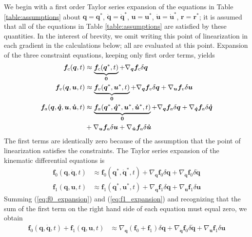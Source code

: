 \documentclass[smallcondensed]{svjour3}                     %
\begin{document}
We begin with a first order Taylor series expansion of the equations in Table
\ref{table:assumptions} about $\bm{q}=\bm{q}^*$, $\bm{\dot{q}}=\bm{\dot{q}}^*$,
$\bm{u}=\bm{u}^*$, $\bm{\dot{u}}=\bm{\dot{u}}^*$, $\bm{r}=\bm{r}^*$; it is
assumed that all of the equations in Table \ref{table:assumptions} are
satisfied by these quantities.  In the interest of brevity, we omit writing
this point of linearization in each gradient in the calculations below; all are
evaluated at this point.  Expansion of the three constraint
equations, keeping only first order terms, yields
\begin{align}
  \label{eq:configuration_expansion}
  \bm{f}_{c}(\bm{q}, t) &\approx \underbrace{\bm{f}_{c}(\bm{q}^*, t)}_{\bm{0}} +
  \nabla_{\bm{q}}\bm{f}_{c} \delta \bm{q}\\
  \label{eq:velocity_expansion}
  \bm{f}_{v}(\bm{q}, \bm{u}, t) &\approx \underbrace{\bm{f}_{v}(\bm{q}^*,
  \bm{u}^*, t)}_{\bm{0}} +  \nabla_{\bm{q}}\bm{f}_{v} \delta \bm{q} +
  \nabla_{\bm{u}}\bm{f}_{v} \delta \bm{u} \\
  \label{eq:acceleration_expansion}
  \bm{f}_{a}(\bm{q}, \bm{\dot{q}}, \bm{u}, \bm{\dot{u}}, t) &\approx
  \underbrace{\bm{f}_{a}(\bm{q}^*, \bm{\dot{q}}^*, \bm{u}^*, \bm{\dot{u}}^*,
t)}_{\bm{0}} +  \nabla_{\bm{q}}\bm{f}_{a} \delta \bm{q} +
\nabla_{\bm{\dot{q}}}\bm{f}_{a}
 \delta \bm{\dot{q}} \notag\\
&+ \nabla_{\bm{u}}\bm{f}_{a} \delta \bm{u} + \nabla_{\bm{\dot{u}}}\bm{f}_{a}
\delta \bm{\dot{u}}
\end{align}
The first terms are identically zero because of the assumption that the
point of linearization satisfies the constraints.  The Taylor series expansion
of the kinematic differential equations is
\begin{align}
  \label{eq:f0_expansion}
  \bm{f}_{0}(\bm{q}, \bm{\dot{q}}, t) &\approx \bm{f}_{0}(\bm{q}^*,
  \bm{\dot{q}}^*, t) + \nabla_{\bm{q}}\bm{f}_{0} \delta\bm{q} +
  \nabla_{\bm{\dot{q}}}\bm{f}_{0} \delta\bm{\dot{q}}\\
  \label{eq:f1_expansion}
  \bm{f}_{1}(\bm{q}, \bm{u}, t) &\approx \bm{f}_{1}(\bm{q}^*,
  \bm{u}^*, t) + \nabla_{\bm{q}}\bm{f}_{1} \delta\bm{q} +
  \nabla_{\bm{u}}\bm{f}_{1} \delta\bm{u}
\end{align}
Summing (\ref{eq:f0_expansion}) and (\ref{eq:f1_expansion}) and recognizing
that the sum of the first term on the right hand side of each equation must
equal zero, we obtain
\begin{align}
  \label{eq:f0_plus_f1_expansion}
  \bm{f}_{0}(\bm{q}, \bm{\dot{q}}, t) + \bm{f}_{1}(\bm{q}, \bm{u}, t) &\approx
  \nabla_{\bm{q}}(\bm{f}_{0} + \bm{f}_{1}) \delta\bm{q} +
  \nabla_{\bm{\dot{q}}}\bm{f}_{0} \delta\bm{\dot{q}} +
  \nabla_{\bm{u}}\bm{f}_{1} \delta\bm{u}
\end{align}
\end{document}
